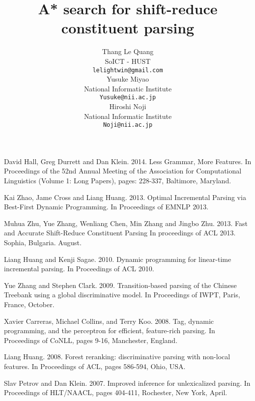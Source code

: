 \documentclass[11pt]{article}
\title{A* search for shift-reduce constituent parsing}
\author{Thang Le Quang \\
  SoICT - HUST\\
  {\tt lelightwin@gmail.com} \\\And
  Yusuke Miyao \\
  National Informatic Institute\\
  {\tt Yusuke@nii.ac.jp} \\\And
  Hiroshi Noji \\
  National Informatic Institute\\
  {\tt Noji@nii.ac.jp} \\}
\date{}
\begin{document}
\maketitle









%
%

\begin{thebibliography}{Reference}

\newblock David Hall, Greg Durrett and Dan Klein. 2014.
\newblock Less Grammar, More Features.
\newblock In Proceedings of the 52nd Annual Meeting of the Association for Computational Linguistics (Volume 1: Long Papers), pages: 228-337, Baltimore, Maryland.
	
\newblock Kai Zhao, Jame Cross and Liang Huang. 2013.
\newblock Optimal Incremental Parsing via Best-First Dynamic Programming.
\newblock In Proceedings of EMNLP 2013.

\newblock Muhua Zhu, Yue Zhang, Wenliang Chen, Min Zhang and Jingbo Zhu. 2013.
\newblock Fast and Accurate Shift-Reduce Constituent Parsing
\newblock In proceedings of ACL 2013. Sophia, Bulgaria. August.
 
\newblock Liang Huang and Kenji Sagae. 2010. 
\newblock Dynamic programming for linear-time incremental parsing. 
\newblock In Proceedings of ACL 2010.

\newblock Yue Zhang and Stephen Clark. 2009.
\newblock Transition-based parsing of the Chinese Treebank using a global discriminative model.
\newblock In Proceedings of IWPT, Paris, France, October.

\newblock Xavier Carreras, Michael Collins, and Terry Koo. 2008.
\newblock Tag, dynamic programming, and the perceptron for efficient, feature-rich parsing.
\newblock In Proceedings of CoNLL, pages 9-16, Manchester, England.

\newblock Liang Huang. 2008.
\newblock Forest reranking: discriminative parsing with non-local features.
\newblock In Proceedings of ACL, pages 586-594, Ohio, USA.

\newblock Slav Petrov and Dan Klein. 2007.
\newblock Improved inference for unlexicalized parsing.
\newblock In Proceedings of HLT/NAACL, pages 404-411, Rochester, New York, April.


\end{thebibliography}
\end{document}
